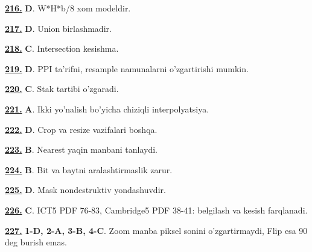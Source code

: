 \documentclass[10pt,a4paper,oneside]{article}
\begin{document}
\noindent\hyperlink{q216}{\textbf{216.}} \textbf{D}.  W*H*b/8 xom modeldir.
\par\vspace{3mm}
\noindent\hyperlink{q217}{\textbf{217.}} \textbf{D}.  Union birlashmadir.
\par\vspace{3mm}
\noindent\hyperlink{q218}{\textbf{218.}} \textbf{C}.  Intersection kesishma.
\par\vspace{3mm}
\noindent\hyperlink{q219}{\textbf{219.}} \textbf{D}.  PPI ta'rifni, resample namunalarni o'zgartirishi mumkin.
\par\vspace{3mm}
\noindent\hyperlink{q220}{\textbf{220.}} \textbf{C}.  Stak tartibi o'zgaradi.
\par\vspace{3mm}
\noindent\hyperlink{q221}{\textbf{221.}} \textbf{A}.  Ikki yo'nalish bo'yicha chiziqli interpolyatsiya.
\par\vspace{3mm}
\noindent\hyperlink{q222}{\textbf{222.}} \textbf{D}.  Crop va resize vazifalari boshqa.
\par\vspace{3mm}
\noindent\hyperlink{q223}{\textbf{223.}} \textbf{B}.  Nearest yaqin manbani tanlaydi.
\par\vspace{3mm}
\noindent\hyperlink{q224}{\textbf{224.}} \textbf{B}.  Bit va baytni aralashtirmaslik zarur.
\par\vspace{3mm}
\noindent\hyperlink{q225}{\textbf{225.}} \textbf{D}.  Mask nondestruktiv yondashuvdir.
\par\vspace{3mm}
\noindent\hyperlink{q226}{\textbf{226.}} \textbf{C}.  ICT5 PDF 76-83, Cambridge5 PDF 38-41: belgilash va kesish farqlanadi.
\par\vspace{3mm}
\noindent\hyperlink{q227}{\textbf{227.}} \textbf{1-D, 2-A, 3-B, 4-C}.  Zoom manba piksel sonini o'zgartirmaydi, Flip esa 90 deg  burish emas.
\par\vspace{3mm}
\end{document}
